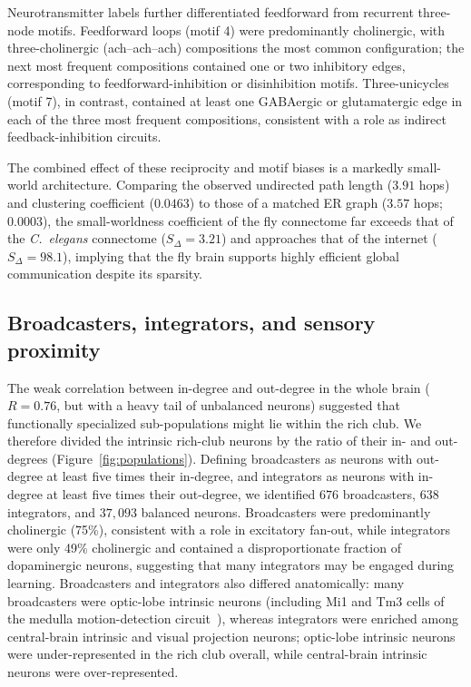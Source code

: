 \documentclass[11pt]{article}
\begin{document}
Neurotransmitter labels further differentiated feedforward from recurrent
three-node motifs. Feedforward loops (motif 4) were predominantly
cholinergic, with three-cholinergic (ach--ach--ach) compositions the most
common configuration; the next most frequent compositions contained one or
two inhibitory edges, corresponding to feedforward-inhibition or
disinhibition motifs. Three-unicycles (motif 7), in contrast, contained
at least one GABAergic or glutamatergic edge in each of the three most
frequent compositions, consistent with a role as indirect
feedback-inhibition circuits.

The combined effect of these reciprocity and motif biases is a markedly
small-world architecture. Comparing the observed undirected path length
($3.91$ hops) and clustering coefficient ($0.0463$) to those of a matched
ER graph ($3.57$ hops; $0.0003$), the small-worldness coefficient of the
fly connectome far exceeds that of the \textit{C.\ elegans} connectome
($S_\Delta = 3.21$) and approaches that of the internet
($S_\Delta = 98.1$), implying that the fly brain supports highly
efficient global communication despite its sparsity.

\subsection{Broadcasters, integrators, and sensory proximity}

The weak correlation between in-degree and out-degree in the whole brain
($R = 0.76$, but with a heavy tail of unbalanced neurons) suggested that
functionally specialized sub-populations might lie within the rich club.
We therefore divided the intrinsic rich-club neurons by the ratio of their
in- and out-degrees (Figure~\ref{fig:populations}). Defining broadcasters
as neurons with out-degree at least five times their in-degree, and
integrators as neurons with in-degree at least five times their
out-degree, we identified $676$ broadcasters, $638$ integrators, and
$37{,}093$ balanced neurons. Broadcasters were predominantly cholinergic
(75\%), consistent with a role in excitatory fan-out, while integrators
were only 49\% cholinergic and contained a disproportionate fraction of
dopaminergic neurons, suggesting that many integrators may be engaged
during learning. Broadcasters and integrators also differed anatomically:
many broadcasters were optic-lobe intrinsic neurons (including Mi1 and Tm3
cells of the medulla motion-detection
circuit~\cite{maisak2013directional}), whereas integrators were
enriched among central-brain intrinsic and visual projection neurons;
optic-lobe intrinsic neurons were under-represented in the rich club
overall, while central-brain intrinsic neurons were over-represented.
\end{document}
